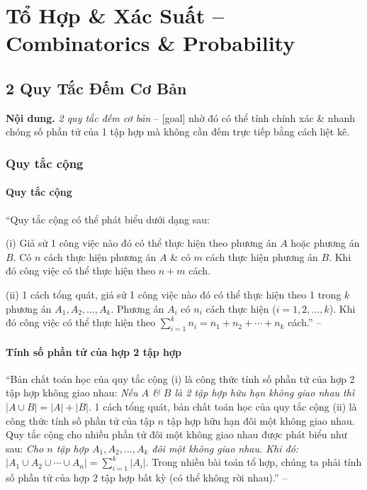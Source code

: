 \documentclass[oneside]{book}
\numberwithin{equation}{section}
\begin{document}

\chapter{Tổ Hợp \& Xác Suất -- Combinatorics \& Probability}

\section{2 Quy Tắc Đếm Cơ Bản}
\textbf{Nội dung.} \textit{2 quy tắc đếm cơ bản} -- [goal] nhờ đó có thể tính chính xác \& nhanh chóng số phần tử của 1 tập hợp mà không cần đếm trực tiếp bằng cách liệt kê.

\subsection{Quy tắc cộng}

\subsubsection{Quy tắc cộng}
``Quy tắc cộng có thể phát biểu dưới dạng sau:
\begin{enumerate*}
	\item[(i)] Giả sử 1 công việc nào đó có thể thực hiện theo phương án $A$ hoặc phương án $B$. Có $n$ cách thực hiện phương án $A$ \& có $m$ cách thực hiện phương án $B$. Khi đó công việc có thể thực hiện theo $n + m$ cách.
	\item[(ii)] 1 cách tổng quát, giả sử 1 công việc nào đó có thể thực hiện theo 1 trong $k$ phương án $A_1,A_2,\ldots,A_k$. Phương án $A_i$ có $n_i$ cách thực hiện ($i = 1,2,\ldots,k$). Khi đó công việc có thể thực hiện theo $\sum_{i=1}^k n_i = n_1 + n_2 + \cdots + n_k$ cách.'' -- \cite[p. 79]{TL_chuyen_Toan_Dai_So_Giai_Tich_11}
\end{enumerate*}

\subsubsection{Tính số phần tử của hợp 2 tập hợp}
``Bản chất toán học của quy tắc cộng (i) là công thức tính số phần tử của hợp 2 tập hợp không giao nhau: \textit{Nếu $A$ \& $B$ là 2 tập hợp hữu hạn không giao nhau thì $|A\cup B| = |A| + |B|$}. 1 cách tổng quát, bản chất toán học của quy tắc cộng (ii) là công thức tính số phần tử của tập $n$ tập hợp hữu hạn đôi một không giao nhau. Quy tắc cộng cho nhiều phần tử đôi một không giao nhau được phát biểu như sau: \textit{Cho $n$ tập hợp $A_1,A_2,\ldots,A_k$ đôi một không giao nhau. Khi đó: $|A_1\cup A_2\cup\cdots\cup A_n| = \sum_{i=1}^k |A_i|$}. Trong nhiều bài toán tổ hợp, chúng ta phải tính số phần tử của hợp 2 tập hợp bất kỳ (có thể không rời nhau).'' -- \cite[pp. 79--80]{TL_chuyen_Toan_Dai_So_Giai_Tich_11}
\end{document}
